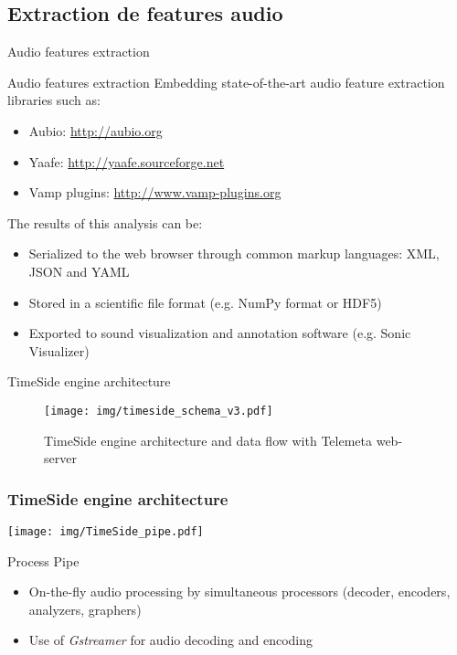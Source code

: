 \documentclass[final, hyperref, table]{beamer}
\begin{document}
\subsection{Extraction de features audio}
\begin{frame}{Audio features extraction}
\begin{block}{Audio features extraction}
Embedding state-of-the-art audio feature extraction libraries such as:

\begin{itemize}\footnotesize
\item Aubio:
    \url{http://aubio.org}

\item Yaafe:
    \url{http://yaafe.sourceforge.net}

\item Vamp plugins:  
    \url{http://www.vamp-plugins.org}
\end{itemize}


The results of this
  analysis can be:
  \begin{itemize}\footnotesize
 \item Serialized to the web browser through common markup languages:
    XML, JSON and YAML
  \item Stored in a scientific file format (e.g. NumPy format or
    HDF5)
  \item Exported to sound visualization and annotation software
    (e.g. Sonic Visualizer)
 
  \end{itemize}
\end{block}

\end{frame}
\begin{frame}{TimeSide engine architecture}
  \begin{figure}[htbp]
  \centering
  \texttt{[image: img/timeside\_schema\_v3.pdf]}
  \caption{TimeSide engine architecture and data flow with Telemeta web-server}\label{fig:TimeSide_Archi}
\end{figure}
\end{frame}
  
\begin{frame}
  \frametitle{TimeSide engine architecture}
  \begin{center}
    \texttt{[image: img/TimeSide\_pipe.pdf]}
  \end{center}
  \begin{block}{Process Pipe}
    \begin{itemize}
    \item On-the-fly audio processing by simultaneous processors (decoder, encoders, analyzers, graphers)
    \item Use of \emph{Gstreamer} for audio decoding and encoding    \end{itemize}
  \end{block}
\end{frame}
\end{document}
